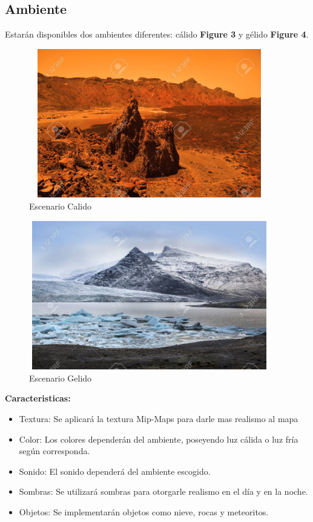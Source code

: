 \documentclass[a4paper]{article}
\begin{document}
\subsection{Ambiente}
Estarán disponibles dos ambientes diferentes: cálido \textbf{Figure 3} y gélido \textbf{Figure 4}.\\

\begin{figure}
	\centering
	\includegraphics[width=10.5cm,height=6.5cm]{escenarioCalido.jpg}
	\caption{Escenario Calido}
	\label{FI1_3}
\end{figure}

\begin{figure}
	\centering
	\includegraphics[width=10.5cm,height=6.5cm]{escenarioGelido.jpg}
	\caption{Escenario Gelido}
	\label{FI1_4}
\end{figure}

\textbf{Caracteristicas:}

\begin{itemize}
	\item Textura: Se aplicará la textura Mip-Maps para darle mas realismo al mapa
	\item Color: Los colores dependerán del ambiente, poseyendo luz cálida o luz fría según corresponda.
	\item Sonido: El sonido dependerá del ambiente escogido.
	\item Sombras: Se utilizará sombras para otorgarle realismo en el día y en la noche.
	\item Objetos: Se implementarán objetos como nieve, rocas y meteoritos.
	
\end{itemize}
\end{document}
